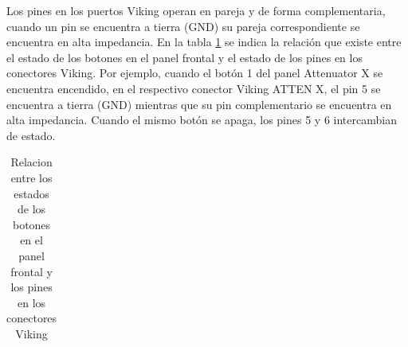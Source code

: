 Los pines en los puertos Viking operan en pareja y de forma complementaria, cuando un pin se encuentra a tierra (GND) su	pareja correspondiente se encuentra en alta impedancia. En la tabla \ref{Tab:RelacionEstadoBotonesViking} se indica la relación que existe entre el estado de los botones en el panel frontal y el estado de los pines en los conectores Viking. Por ejemplo, cuando el botón 1 del panel Attenuator X se encuentra encendido, en el respectivo conector Viking ATTEN X, el pin 5 se encuentra a tierra (GND) mientras que su pin complementario se encuentra en alta impedancia. Cuando el mismo botón se apaga, los pines 5 y 6 intercambian de estado.

\begin{table}
	\centering
	\caption{Relacion entre los estados de los botones en el panel frontal y los pines en los conectores Viking}
	\label{Tab:RelacionEstadoBotonesViking}
	\begin{tabular}{m{1.2179999cm}m{1.2179999cm}m{2.892cm}|m{2.217cm}|m{2.218cm}|}
		

\end{tabular}
\end{table}
